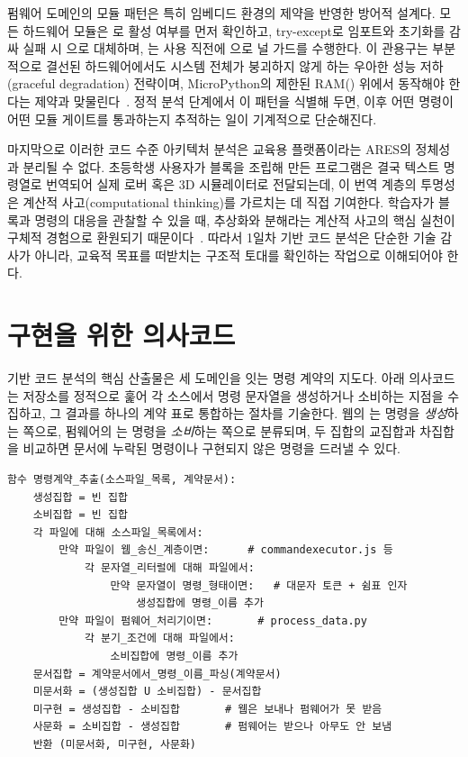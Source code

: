 펌웨어 도메인의 모듈 패턴은 특히 임베디드 환경의 제약을 반영한 방어적 설계다. 모든 하드웨어 모듈은 로 활성 여부를 먼저 확인하고, try-except로 임포트와 초기화를 감싸 실패 시 으로 대체하며, 는 사용 직전에 으로 널 가드를 수행한다. 이 관용구는 부분적으로 결선된 하드웨어에서도 시스템 전체가 붕괴하지 않게 하는 우아한 성능 저하(graceful degradation) 전략이며, MicroPython의 제한된 RAM() 위에서 동작해야 한다는 제약과 맞물린다~\cite{micropython, rp2040}. 정적 분석 단계에서 이 패턴을 식별해 두면, 이후 어떤 명령이 어떤 모듈 게이트를 통과하는지 추적하는 일이 기계적으로 단순해진다.

마지막으로 이러한 코드 수준 아키텍처 분석은 교육용 플랫폼이라는 ARES의 정체성과 분리될 수 없다. 초등학생 사용자가 블록을 조립해 만든 프로그램은 결국 텍스트 명령열로 번역되어 실제 로버 혹은 3D 시뮬레이터로 전달되는데, 이 번역 계층의 투명성은 계산적 사고(computational thinking)를 가르치는 데 직접 기여한다. 학습자가 블록과 명령의 대응을 관찰할 수 있을 때, 추상화와 분해라는 계산적 사고의 핵심 실천이 구체적 경험으로 환원되기 때문이다~\cite{wing2006ct, brennan2012ct}. 따라서 1일차 기반 코드 분석은 단순한 기술 감사가 아니라, 교육적 목표를 떠받치는 구조적 토대를 확인하는 작업으로 이해되어야 한다.

\section{구현을 위한 의사코드}

기반 코드 분석의 핵심 산출물은 세 도메인을 잇는 명령 계약의 지도다. 아래 의사코드는 저장소를 정적으로 훑어 각 소스에서 명령 문자열을 생성하거나 소비하는 지점을 수집하고, 그 결과를 하나의 계약 표로 통합하는 절차를 기술한다. 웹의 는 명령을 \emph{생성}하는 쪽으로, 펌웨어의 는 명령을 \emph{소비}하는 쪽으로 분류되며, 두 집합의 교집합과 차집합을 비교하면 문서에 누락된 명령이나 구현되지 않은 명령을 드러낼 수 있다.

\begin{verbatim}
함수 명령계약_추출(소스파일_목록, 계약문서):
    생성집합 = 빈 집합
    소비집합 = 빈 집합
    각 파일에 대해 소스파일_목록에서:
        만약 파일이 웹_송신_계층이면:      # commandexecutor.js 등
            각 문자열_리터럴에 대해 파일에서:
                만약 문자열이 명령_형태이면:   # 대문자 토큰 + 쉼표 인자
                    생성집합에 명령_이름 추가
        만약 파일이 펌웨어_처리기이면:       # process_data.py
            각 분기_조건에 대해 파일에서:
                소비집합에 명령_이름 추가
    문서집합 = 계약문서에서_명령_이름_파싱(계약문서)
    미문서화 = (생성집합 U 소비집합) - 문서집합
    미구현 = 생성집합 - 소비집합       # 웹은 보내나 펌웨어가 못 받음
    사문화 = 소비집합 - 생성집합       # 펌웨어는 받으나 아무도 안 보냄
    반환 (미문서화, 미구현, 사문화)
\end{verbatim}

